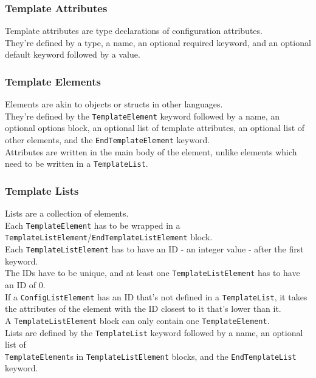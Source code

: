 \documentclass[12pt]{article}
\begin{document}
    \subsubsection{Template Attributes}
    Template attributes are type declarations of configuration attributes. \\
    They're defined by a type, a name, an optional required keyword, and an optional default keyword followed by a value.

    \subsubsection{Template Elements}
    Elements are akin to objects or structs in other languages. \\
    They're defined by the \texttt{TemplateElement} keyword followed by a name, an optional options block, an optional list of template attributes, an optional list of other elements, and the \texttt{EndTemplateElement} keyword. \\
    Attributes are written in the main body of the element, unlike elements which need to be written in a \texttt{TemplateList}.

    \subsubsection{Template Lists}
    Lists are a collection of elements. \\
    Each \texttt{TemplateElement} has to be wrapped in a \texttt{TemplateListElement}/\texttt{EndTemplateListElement} block. \\
    Each \texttt{TemplateListElement} has to have an ID - an integer value - after the first keyword. \\
    The IDs have to be unique, and at least one \texttt{TemplateListElement} has to have an ID of 0. \\
    If a \texttt{ConfigListElement} has an ID that's not defined in a \texttt{TemplateList}, it takes the attributes of the element with the ID closest to it that's lower than it. \\
    A \texttt{TemplateListElement} block can only contain one \texttt{TemplateElement}. \\
    Lists are defined by the \texttt{TemplateList} keyword followed by a name, an optional list of \\ \texttt{TemplateElement}s in \texttt{TemplateListElement} blocks, and the \texttt{EndTemplateList} keyword.
\end{document}
